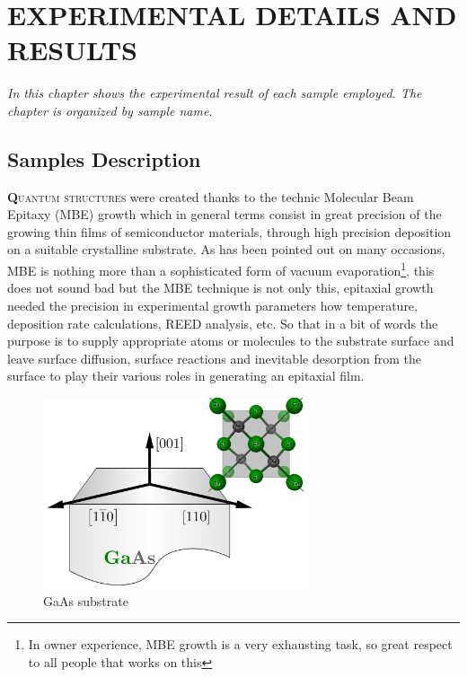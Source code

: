 \chapter{EXPERIMENTAL DETAILS AND  RESULTS }
\label{chap:experimentals-details-and-results}
\textit{In this chapter shows the experimental result of each sample employed. The chapter is organized by sample name.}
\vfill
\minitoc
\newpage

\section{Samples Description}
\label{sec:chapter-3-section-samples-description}
\vspace{-10mm}
\lettrine[lines=3, lraise=.1, nindent=0mm, slope=0mm]{\textbf{Q}}{uantum structures} were created thanks to the technic Molecular Beam Epitaxy (MBE) growth which in general terms consist in great precision of the growing thin films of semiconductor materials, through high precision  deposition on a suitable  crystalline substrate. As has been pointed out on many occasions, MBE  is nothing more than a sophisticated form of vacuum evaporation\footnote{In owner  experience, MBE growth is a very exhausting task, so great respect to all people that works on this}\cite{orton2015molecular}, this does not sound bad but the MBE technique is not only this, epitaxial growth needed  the precision in experimental  growth parameters how temperature, deposition rate calculations, REED analysis, etc. So that in a bit of words the purpose is to  supply appropriate atoms or molecules to the substrate surface and leave surface diffusion, surface reactions and inevitable desorption from the surface to play their various roles in generating an epitaxial film\cite{orton2015molecular,grundmann2010physics}. 

\begin{figure}[H]
	\centering
	\includegraphics[width=0.7\textwidth]{../figures/chapter-3/crystal-1/build/crystal-1.pdf}
	\caption[GaAs substrate growth direction]{GaAs substrate}
	\label{fig:chapter-3 GaAs Substrate}
\end{figure}

